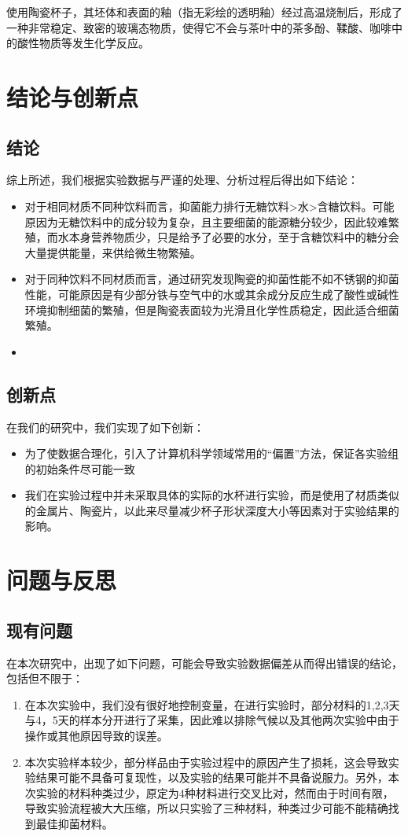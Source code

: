 \documentclass[12pt,a4paper]{ctexart}
\begin{document}
使用陶瓷杯子，其坯体和表面的釉（指无彩绘的透明釉）经过高温烧制后，形成了一种非常稳定、致密的玻璃态物质，使得它不会与茶叶中的茶多酚、鞣酸、咖啡中的酸性物质等发生化学反应。 

\section{结论与创新点}
\subsection{结论}
综上所述，我们根据实验数据与严谨的处理、分析过程后得出如下结论：
\begin{itemize}
    \item 对于相同材质不同种饮料而言，抑菌能力排行无糖饮料>水>含糖饮料。可能原因为无糖饮料中的成分较为复杂，且主要细菌的能源糖分较少，因此较难繁殖，而水本身营养物质少，只是给予了必要的水分，至于含糖饮料中的糖分会大量提供能量，来供给微生物繁殖。
    \item 对于同种饮料不同材质而言，通过研究发现陶瓷的抑菌性能不如不锈钢的抑菌性能，可能原因是有少部分铁与空气中的水或其余成分反应生成了酸性或碱性环境抑制细菌的繁殖，但是陶瓷表面较为光滑且化学性质稳定，因此适合细菌繁殖。
    \item 
\end{itemize}

\subsection{创新点}
在我们的研究中，我们实现了如下创新：
\begin{itemize}
    \item 为了使数据合理化，引入了计算机科学领域常用的“偏置”方法，保证各实验组的初始条件尽可能一致
    \item 我们在实验过程中并未采取具体的实际的水杯进行实验，而是使用了材质类似的金属片、陶瓷片，以此来尽量减少杯子形状深度大小等因素对于实验结果的影响。
\end{itemize}

\section{问题与反思}\label{sec:problem}
\subsection{现有问题}
在本次研究中，出现了如下问题，可能会导致实验数据偏差从而得出错误的结论，包括但不限于：
\begin{enumerate}
    \item 在本次实验中，我们没有很好地控制变量，在进行实验时，部分材料的1,2,3天与4，5天的样本分开进行了采集，因此难以排除气候以及其他两次实验中由于操作或其他原因导致的误差。
    \item 本次实验样本较少，部分样品由于实验过程中的原因产生了损耗，这会导致实验结果可能不具备可复现性，以及实验的结果可能并不具备说服力。另外，本次实验的材料种类过少，原定为4种材料进行交叉比对，然而由于时间有限，导致实验流程被大大压缩，所以只实验了三种材料，种类过少可能不能精确找到最佳抑菌材料。
\end{enumerate}
\end{document}
